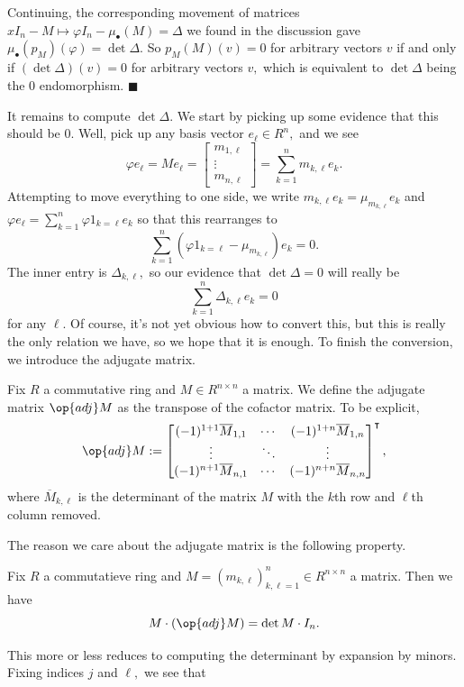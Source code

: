 Continuing, the corresponding movement of matrices $xI_n-M\mapsto\varphi I_n-\mu_\bullet(M)=\Delta$ we found in the discussion gave $\mu_\bullet(p_M)(\varphi)=\det\Delta.$ So $p_M(M)(v)=0$ for arbitrary vectors $v$ if and only if $(\det\Delta)(v)=0$ for arbitrary vectors $v,$ which is equivalent to $\det\Delta$ being the $0$ endomorphism. $\blacksquare$

It remains to compute $\det\Delta.$ We start by picking up some evidence that this should be $0.$ Well, pick up any basis vector $e_\ell\in R^n,$ and we see
\[\varphi e_\ell=Me_\ell=\begin{bmatrix}m_{1,\ell} \\ \vdots \\ m_{n,\ell}\end{bmatrix}=\sum_{k=1}^nm_{k,\ell}e_k.\]
Attempting to move everything to one side, we write $m_{k,\ell}e_k=\mu_{m_{k,\ell}}e_k$ and $\varphi e_\ell=\sum_{k=1}^n\varphi1_{k=\ell}e_k$ so that this rearranges to
\[\sum_{k=1}^n(\varphi1_{k=\ell}-\mu_{m_{k,\ell}})e_k=0.\]
The inner entry is $\Delta_{k,\ell},$ so our evidence that $\det\Delta=0$ will really be
\[\sum_{k=1}^n\Delta_{k,\ell}e_k=0\]
for any $\ell.$ Of course, it's not yet obvious how to convert this, but this is really the only relation we have, so we hope that it is enough. To finish the conversion, we introduce the adjugate matrix.
\begin{definition}
    Fix $R$ a commutative ring and $M\in R^{n\times n}$ a matrix. We define the adjugate matrix $\op{adj}M$ as the transpose of the cofactor matrix. To be explicit,
    \[\op{adj}M:=\begin{bmatrix}
        (-1)^{1+1}\overline M_{1,1} & \cdots & (-1)^{1+n}\overline M_{1,n} \\
        \vdots & \ddots & \vdots \\
        (-1)^{n+1}\overline M_{n,1} & \cdots & (-1)^{n+n}\overline M_{n,n}
    \end{bmatrix}^\intercal,\]
    where $\overline M_{k,\ell}$ is the determinant of the matrix $M$ with the $k$th row and $\ell$th column removed.
\end{definition}
The reason we care about the adjugate matrix is the following property.
\begin{proposition}
    Fix $R$ a commutatieve ring and $M=(m_{k,\ell})_{k,\ell=1}^n\in R^{n\times n}$ a matrix. Then we have
    \[M\cdot(\op{adj}M)=\det M\cdot I_n.\]
\end{proposition}
This more or less reduces to computing the determinant by expansion by minors. Fixing indices $j$ and $\ell,$ we see that
